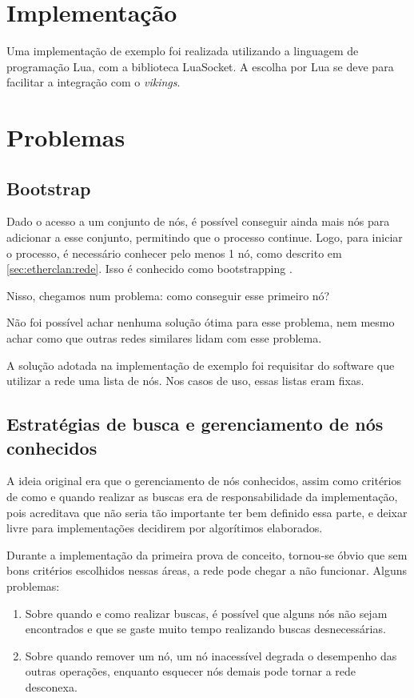 \section{Implementação}
  Uma implementação de exemplo foi realizada utilizando a linguagem de programação Lua, com
  a biblioteca LuaSocket\footnotemark. A escolha por Lua se deve para facilitar a integração
  com o \textit{vikings}.
  

\section{Problemas}
  \subsection{Bootstrap}
    Dado o acesso a um conjunto de nós, é possível conseguir ainda mais nós para adicionar a esse
    conjunto, permitindo que o processo continue. Logo, para iniciar o processo, é necessário
    conhecer pelo menos 1 nó, como descrito em \ref{sec:etherclan:rede}. Isso é conhecido como
    bootstrapping \cite{tech:bootstrapping}.
    
    Nisso, chegamos num problema: como conseguir esse primeiro nó?
    
    Não foi possível achar nenhuma solução ótima para esse problema, nem mesmo achar como que outras
    redes similares lidam com esse problema.
    
    A solução adotada na implementação de exemplo foi requisitar do software que utilizar a rede uma
    lista de nós. Nos casos de uso, essas listas eram fixas.
    
  \subsection{Estratégias de busca e gerenciamento de nós conhecidos}
    A ideia original era que o gerenciamento de nós conhecidos, assim como critérios de como e
    quando realizar as buscas era de responsabilidade da implementação, pois acreditava que não
    seria tão importante ter bem definido essa parte, e deixar livre para implementações decidirem
    por algorítimos elaborados.
    
    Durante a implementação da primeira prova de conceito, tornou-se óbvio que sem bons critérios
    escolhidos nessas áreas, a rede pode chegar a não funcionar. Alguns problemas:
    \begin{enumerate}
      \item Sobre quando e como realizar buscas, é possível que alguns nós não sejam encontrados e
        que se gaste muito tempo realizando buscas desnecessárias.
      \item Sobre quando remover um nó, um nó inacessível degrada o desempenho das outras operações,
        enquanto esquecer nós demais pode tornar a rede desconexa.
    \end{enumerate}